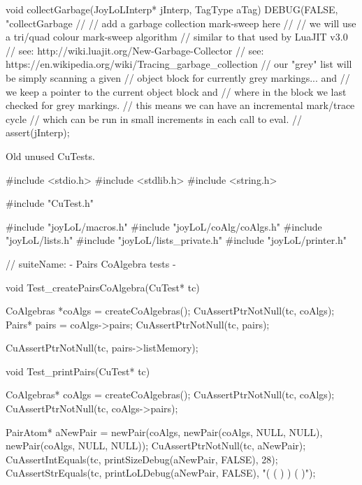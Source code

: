 \startCCode
void collectGarbage(JoyLoLInterp* jInterp, TagType aTag) {
  DEBUG(FALSE, "collectGarbage %
  //
  // add a garbage collection mark-sweep here
  //
  // we will use a tri/quad colour mark-sweep algorithm
  // similar to that used by LuaJIT v3.0
  // see: http://wiki.luajit.org/New-Garbage-Collector
  // see: https://en.wikipedia.org/wiki/Tracing_garbage_collection
  // our "grey" list will be simply scanning a given 
  // object block for currently grey markings... and
  // we keep a pointer to the current object block and
  // where in the block we last checked for grey markings.
  // this means we can have an incremental mark/trace cycle
  // which can be run in small increments in each call to eval.
  //
  assert(jInterp);
}
\stopCCode

Old unused CuTests.

\starttyping
#include <stdio.h>
#include <stdlib.h>
#include <string.h>

#include "CuTest.h"

#include "joyLoL/macros.h"
#include "joyLoL/coAlg/coAlgs.h"
#include "joyLoL/lists.h"
#include "joyLoL/lists_private.h"
#include "joyLoL/printer.h"

// suiteName: - Pairs CoAlgebra tests -

void Test_createPairsCoAlgebra(CuTest* tc) {
  CoAlgebras *coAlgs = createCoAlgebras();
  CuAssertPtrNotNull(tc, coAlgs);
  Pairs* pairs = coAlgs->pairs;
  CuAssertPtrNotNull(tc, pairs);

  CuAssertPtrNotNull(tc, pairs->listMemory);
}

void Test_printPairs(CuTest* tc) {
  CoAlgebras* coAlgs = createCoAlgebras();
  CuAssertPtrNotNull(tc, coAlgs);
  CuAssertPtrNotNull(tc, coAlgs->pairs);

  PairAtom* aNewPair = newPair(coAlgs,
                               newPair(coAlgs, NULL, NULL),
                               newPair(coAlgs, NULL, NULL));
  CuAssertPtrNotNull(tc, aNewPair);
  CuAssertIntEquals(tc, printSizeDebug(aNewPair, FALSE), 28);
  CuAssertStrEquals(tc, printLoLDebug(aNewPair, FALSE), "( ( ) ) ( )");
}
\stoptyping
